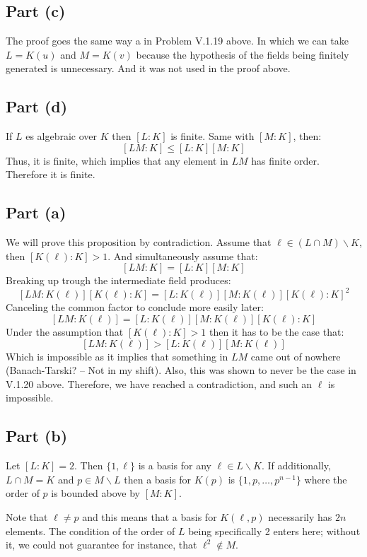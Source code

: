 \subsection*{Part (c)}
The proof goes the same way a in Problem V.1.19 above.
In which we can take $L=K(u)$ and $M=K(v)$ because the hypothesis of the fields being finitely generated is unnecessary.
And it was not used in the proof above.

\subsection*{Part (d)}
If $L$ es algebraic over $K$ then $[L:K]$ is finite. 
Same with $[M:K]$, then:
$$[LM:K]\leq [L:K][M:K]$$
Thus, it is finite, which implies that any element in $LM$ has finite order.
Therefore it is finite.

\subsection*{Part (a)}
We will prove this proposition by contradiction. Assume that $\ell \in (L\cap M)\backslash K$, then $[K(\ell):K]>1$. And simultaneously assume that:
$$[LM:K] = [L:K][M:K]$$
Breaking up trough the intermediate field produces:
$$[LM:K(\ell)][K(\ell):K] = [L:K(\ell)][M:K(\ell)][K(\ell):K]^2$$
Canceling the common factor to conclude more easily later:
$$[LM:K(\ell)] = [L:K(\ell)][M:K(\ell)][K(\ell):K]$$
Under the assumption that $[K(\ell):K]>1$ then it has to be the case that:
$$[LM:K(\ell)] > [L:K(\ell)][M:K(\ell)]$$
Which is impossible as it implies that something in $LM$ came out of nowhere (Banach-Tarski? -- Not in my shift). Also, this was shown to never be the case in V.1.20 above. Therefore, we have reached a contradiction, and such an $\ell$ is impossible.

\subsection*{Part (b)}
Let $[L:K]=2$. Then $\{1,\ell\}$ is a basis for any $\ell\in L\backslash K$.
If additionally, $L\cap M = K$ and $p \in M\backslash L$ then a basis for $K(p)$ is $\{1,p,\ldots,p^{n-1}\}$ where the order of $p$ is bounded above by $[M:K]$. 

Note that $\ell\neq p$ and this means that a basis for $K(\ell,p)$ necessarily has $2n$ elements. The condition of the order of $L$ being specifically 2 enters here; without it, we could not guarantee for instance, that $\ell^2\notin M$. 

